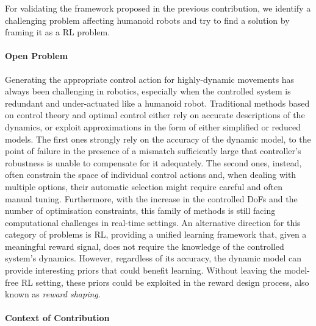 For validating the framework proposed in the previous contribution, we identify a challenging problem affecting humanoid robots and try to find a solution by framing it as a \ac{RL} problem.

\paragraph{Open Problem}

Generating the appropriate control action for highly-dynamic movements has always been challenging in robotics, especially when the controlled system is redundant and under-actuated like a humanoid robot.
Traditional methods based on control theory and optimal control either rely on accurate descriptions of the dynamics, or exploit approximations in the form of either simplified or reduced models.
The first ones strongly rely on the accuracy of the dynamic model, to the point of failure in the presence of a mismatch sufficiently large that controller's robustness is unable to compensate for it adequately.
The second ones, instead, often constrain the space of individual control actions and, when dealing with multiple options, their automatic selection might require careful and often manual tuning.
Furthermore, with the increase in the controlled \acp{DoF} and the number of optimisation constraints, this family of methods is still facing computational challenges in real-time settings.
An alternative direction for this category of problems is \ac{RL}, providing a unified learning framework that, given a meaningful reward signal, does not require the knowledge of the controlled system's dynamics.
However, regardless of its accuracy, the dynamic model can provide interesting priors that could benefit learning.
Without leaving the model-free \ac{RL} setting, these priors could be exploited in the reward design process, also known as \emph{reward shaping}.

\paragraph{Context of Contribution}

